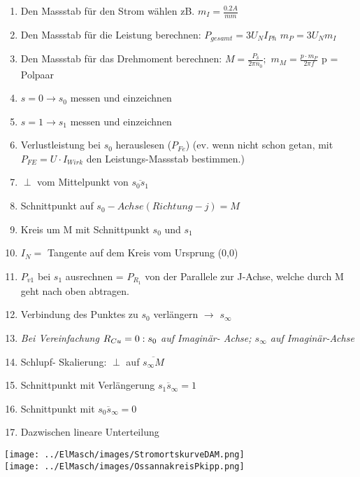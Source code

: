         \begin{minipage}{10.5cm}
            \begin{enumerate}     
                \item Den Massstab für den Strom wählen zB. $m_I=\frac{0.2 A}{mm}$
                \item Den Massstab für die Leistung berechnen: $P_{gesamt}=3U_N I_{Ph}$ $m_P=3U_N m_I$
                \item Den Massstab für das Drehmoment berechnen: $M=\frac{P_\delta}{2\pi n_0};$  $m_M= \frac{p\cdot m_P}{2\pi f}$  p = Polpaar
                \item $s=0 \rightarrow s_{0}$ messen und einzeichnen
                \item $s=1 \rightarrow s_{1}$ messen und einzeichnen
                \item Verlustleistung bei $s_{0}$ herauslesen ($P_{Fe}$) (ev. wenn nicht schon getan, mit \\ $P_{FE} = U \cdot I_{Wirk}$ den Leistungs-Massstab bestimmen.)\\
                \item $\perp$ vom Mittelpunkt von $\overline{s_{0}s_{1}}$
                \item Schnittpunkt auf $s_{0}- Achse (Richtung -j) = M$
                \item Kreis um M mit Schnittpunkt $s_{0}$ und $s_{1}$
                \item $I_N =$ Tangente auf dem Kreis vom Ursprung (0,0)
                \item $P_{v1}$ bei $s_{1}$ ausrechnen = $P_{R_1}$ von der Parallele zur J-Achse, welche durch M geht nach oben abtragen.
                \item Verbindung des Punktes zu $s_{0}$ verlängern $\rightarrow$ $s_{\infty}$
                \item \textit{ Bei Vereinfachung $R_{Cu}=0:\\ s_{0}$ auf Imaginär- Achse; $s_{\infty}$ auf Imaginär-Achse}
                \item Schlupf- Skalierung: $\perp$ auf $\overline{s_{\infty}M}$
                \item Schnittpunkt mit Verlängerung $\overline{s_{1}s_{\infty}}= 1$
                \item Schnittpunkt mit $\overline{s_{0}s_{\infty}}= 0$
                \item Dazwischen lineare Unterteilung
            \end{enumerate}
        \end{minipage}
        \begin{minipage}{7cm}
            \texttt{[image: ../ElMasch/images/StromortskurveDAM.png]}\\
            \texttt{[image: ../ElMasch/images/OssannakreisPkipp.png]}
        \end{minipage}